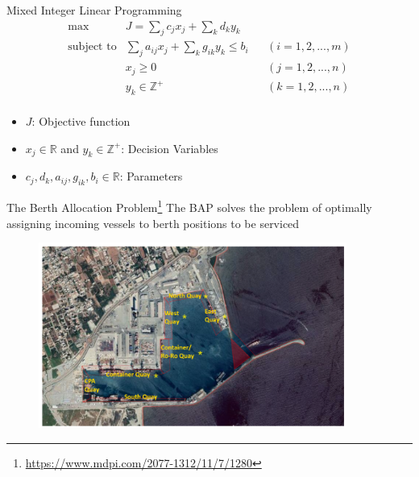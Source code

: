 \documentclass[bigger]{beamer}
\begin{document}
\begin{frame}[label={sec:orgf4f2cec}]{Mixed Integer Linear Programming}
\begin{subequations}
\label{eq:milp-structure}
\begin{align}
&\text{max}        &J = \sum_j c_j x_j + \sum_k d_k y_k&         &               &\label{eq:fuzzy-milp-objective}\\
&\text{subject to} &\sum_j a_{ij} x_j + \sum_k g_{ik} y_k \le b_i&  &(i = 1,2,...,m)& \label{eq:fuzzy-milp-constraint}\\
&                  &x_j \ge 0&                              &(j = 1,2,...,n)& \label{eq:fuzzy-milp-continuous}\\
&                  &y_k \in \mathbb{Z^+}&                   &(k = 1,2,...,n)& \label{eq:fuzzy-milp-integer}\\
&\end{align}
\end{subequations}

\begin{itemize}
\item \(J\): Objective function
\item \(x_j \in \mathbb{R}\) and \(y_k \in \mathbb{Z}^+\): Decision Variables
\item \(c_j, d_k, a_{ij}, g_{ik}, b_i \in \mathbb{R}\): Parameters
\end{itemize}
\end{frame}

\begin{frame}[label={sec:org20f3c86}]{The Berth Allocation Problem\footnote{\url{https://www.mdpi.com/2077-1312/11/7/1280}}}
The BAP solves the problem of optimally assigning incoming vessels to berth positions to be serviced

\begin{figure}[htpb]
\centering
    \includegraphics[width=0.9\textwidth]{img/berthing-sky-picture}
\end{figure}
\end{frame}
\end{document}
